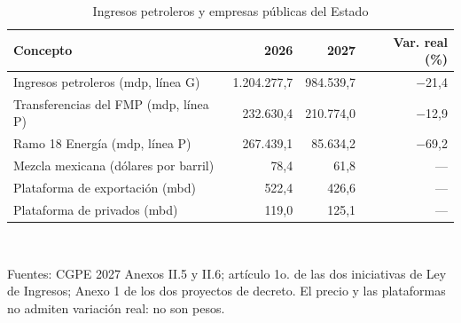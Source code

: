 \begin{table}[htbp]\centering\small
\caption{Ingresos petroleros y empresas públicas del Estado}\label{cua:energ}
\begin{tabular}{lrrr}
\toprule
Concepto & 2026 & 2027 & Var. real (\%) \\
\midrule
Ingresos petroleros (mdp, línea G) & 1.204.277,7 & 984.539,7 & $-$21,4 \\
Transferencias del FMP (mdp, línea P) & 232.630,4 & 210.774,0 & $-$12,9 \\
Ramo 18 Energía (mdp, línea P) & 267.439,1 & 85.634,2 & $-$69,2 \\
Mezcla mexicana (dólares por barril) & 78,4 & 61,8 & --- \\
Plataforma de exportación (mbd) & 522,4 & 426,6 & --- \\
Plataforma de privados (mbd) & 119,0 & 125,1 & --- \\
\bottomrule
\end{tabular}
\\[2pt]\begin{minipage}{0.92\textwidth}\scriptsize Fuentes: CGPE 2027 Anexos II.5 y II.6; artículo 1o. de las dos iniciativas de Ley de Ingresos; Anexo 1 de los dos proyectos de decreto. El precio y las plataformas no admiten variación real: no son pesos.\end{minipage}
\end{table}
